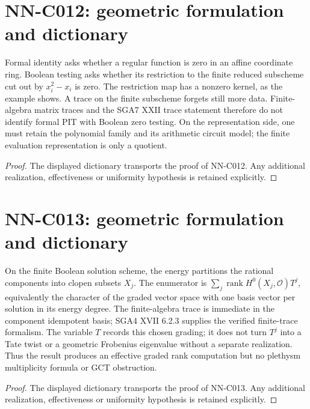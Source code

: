 \section{NN-C012: geometric formulation and dictionary}
\begin{geometricstatement}[NN-C012]
Formal identity asks whether a regular function is zero in an affine coordinate ring. Boolean testing asks whether its restriction to the finite reduced subscheme cut out by $x_i^2-x_i$ is zero. The restriction map has a nonzero kernel, as the example shows. A trace on the finite subscheme forgets still more data. Finite-algebra matrix traces and the SGA7 XXII trace statement therefore do not identify formal PIT with Boolean zero testing. On the representation side, one must retain the polynomial family and its arithmetic circuit model; the finite evaluation representation is only a quotient.
\end{geometricstatement}
\begin{proof} The displayed dictionary transports the proof of NN-C012. Any additional realization, effectiveness or uniformity hypothesis is retained explicitly.\end{proof}


\section{NN-C013: geometric formulation and dictionary}
\begin{geometricstatement}[NN-C013]
On the finite Boolean solution scheme, the energy partitions the rational components into clopen subsets $X_j$. The enumerator is $\sum_j\operatorname{rank}H^0(X_j,\mathcal O)T^j$, equivalently the character of the graded vector space with one basis vector per solution in its energy degree. The finite-algebra trace is immediate in the component idempotent basis; SGA4 XVII 6.2.3 supplies the verified finite-trace formalism. The variable $T$ records this chosen grading; it does not turn $T^j$ into a Tate twist or a geometric Frobenius eigenvalue without a separate realization. Thus the result produces an effective graded rank computation but no plethysm multiplicity formula or GCT obstruction.
\end{geometricstatement}
\begin{proof} The displayed dictionary transports the proof of NN-C013. Any additional realization, effectiveness or uniformity hypothesis is retained explicitly.\end{proof}


